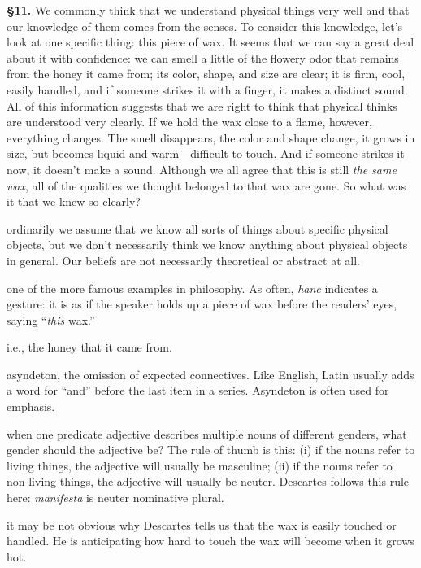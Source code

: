 \textbf{§11.} We commonly think that we understand physical things very well and that our knowledge of them comes from the senses. To consider this knowledge, let's look at one specific thing: this piece of wax. It seems that we can say a great deal about it with confidence: we can smell a little of the flowery odor that remains from the honey it came from; its color, shape, and size are clear; it is firm, cool, easily handled, and if someone strikes it with a finger, it makes a distinct sound. All of this information suggests that we are right to think that physical thinks are understood very clearly. If we hold the wax close to a flame, however, everything changes. The smell disappears, the color and shape change, it grows in size, but becomes liquid and warm---difficult to touch. And if someone strikes it now, it doesn't make a sound. Although we all agree that this is still \textit{the same wax}, all of the qualities we thought belonged to that wax are gone. So what was it that we knew so clearly?

 ordinarily we assume that we know all sorts of things about specific physical objects, but we don't necessarily think we know anything about physical objects in general. Our beliefs are not necessarily theoretical or abstract at all.

 one of the more famous examples in philosophy. As often, \textit{hanc} indicates a gesture: it is as if the speaker holds up a piece of wax before the readers' eyes, saying ``\textit{this} wax.''

 i.e., the honey that it came from.

 asyndeton, the omission of expected connectives. Like English, Latin usually adds a word for ``and'' before the last item in a series. Asyndeton is often used for emphasis.

 when one predicate adjective describes multiple nouns of different genders, what gender should the adjective be? The rule of thumb is this: (i) if the nouns refer to living things, the adjective will usually be masculine; (ii) if the nouns refer to non-living things, the adjective will usually be neuter. Descartes follows this rule here: \textit{manifesta} is neuter nominative plural.

 it may be not obvious why Descartes tells us that the wax is easily touched or handled. He is anticipating how hard to touch the wax will become when it grows hot.

